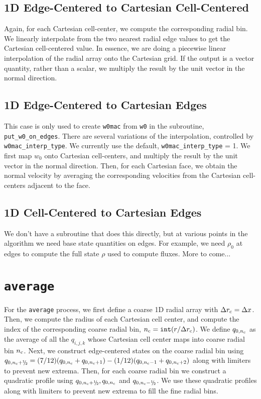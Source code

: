 \subsection{1D Edge-Centered to Cartesian Cell-Centered}
\label{Sec:1D Edge-Centered to Cartesian Cell-Centered}
Again, for each Cartesian cell-center, we compute the corresponding radial
bin.  We linearly interpolate from the two nearest radial edge values 
to get the Cartesian cell-centered value.  In essence,
we are doing a piecewise linear interpolation of the radial array onto the 
Cartesian grid.  If the output is a vector quantity, rather than a scalar, we
multiply the result by the unit vector in the normal direction.
\subsection{1D Edge-Centered to Cartesian Edges}
\label{Sec:1D Edge-Centered to Cartesian Edges}
This case is only used to create {\tt w0mac} from {\tt w0} in the 
subroutine, {\tt put\_w0\_on\_edges}.  There are several variations 
of the interpolation, controlled by {\tt w0mac\_interp\_type}.  We 
currently use the default, {\tt w0mac\_interp\_type} = 1.  We first 
map $w_0$ onto Cartesian cell-centers, and multiply the result by 
the unit vector in the normal direction.  Then, for each Cartesian 
face, we obtain the normal velocity by averaging the corresponding 
velocities from the Cartesian cell-centers adjacent to the face.
\subsection{1D Cell-Centered to Cartesian Edges}
We don't have a subroutine that does this directly, but at various points
in the algorithm we need base state quantities on edges.  For example, we 
need $\rho_0$ at edges to compute the full state $\rho$ used to compute 
fluxes.  More to come...
\section{{\tt average}}\label{Sec:Avg}
For the {\tt average} process, we first define a coarse 1D radial array 
with $\Delta r_{\rm c} = \Delta x$.  Then, we compute the radius of each
Cartesian cell center, and compute the index of the corresponding coarse radial 
bin, $n_{\rm c} = \mathtt{int}(r / \Delta r_{\rm c})$.  
We define $q_{0,n_{\rm c}}$ as the average of all the $q_{i,j,k}$ whose 
Cartesian cell center maps into coarse radial bin $n_{\rm c}$.
Next, we construct edge-centered states on the coarse radial bin using 
$q_{0,n_{\rm c}+\myhalf} = (7/12)(q_{0,n_{\rm c}}+q_{0,n_{\rm c}+1}) 
- (1/12)(q_{0,n_{\rm c}-1}+q_{0,n_{\rm c}+2})$ along with limiters to prevent
new extrema.  Then, for each coarse radial bin
we construct a quadratic profile using $q_{0,n_{\rm c}+\myhalf}, q_{0,n_{\rm c}}$ 
and $q_{0,n_{\rm c}-\myhalf}$.  We use these quadratic profiles along with limiters
to prevent new extrema to fill the fine radial bins.

